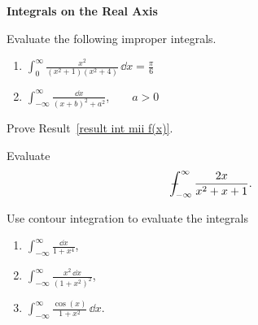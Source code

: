 {%
\begin{large}
  \noindent
  \textbf{Integrals on the Real Axis}
\end{large}





\begin{Exercise}
  \label{exercise integrate x2 x2+1 x2+4}
  Evaluate the following improper integrals.
  \begin{enumerate}
  \item 
    $\displaystyle \int_0^\infty \frac{x^2}{(x^2 + 1) (x^2 + 4)}\,\dd x = \frac{\pi}{6}$
  \item 
    $\displaystyle \int_{-\infty}^\infty \frac{\dd x}{(x + b)^2 + a^2}$,~~~~$a > 0$
  \end{enumerate}

\end{Exercise}







\begin{Exercise}
  \label{exercise int mii f(x)}
  Prove Result~\ref{result int mii f(x)}.

\end{Exercise}





\begin{Exercise}
  \label{exercise 2x/(x^2+x+1)}
  Evaluate
  \[
  - \negthickspace \negthickspace \negthickspace \negmedspace \int_{-\infty}^\infty \frac{2 x}{x^2 + x + 1}.
  \]

\end{Exercise}



\begin{Exercise}
  \label{exercise 1/(x^4+1)}
  Use contour integration to evaluate the integrals
  \begin{enumerate}
  \item $\displaystyle \int_{-\infty}^\infty \frac{\dd x}{1+x^4}$, 
  \item $\displaystyle \int_{-\infty}^\infty \frac{x^2 \,\dd x}{(1+x^2)^2}$,
  \item $\displaystyle \int_{-\infty}^\infty \frac{\cos(x)}{1+x^2} \,\dd x$.
  \end{enumerate}


\end{Exercise}}
